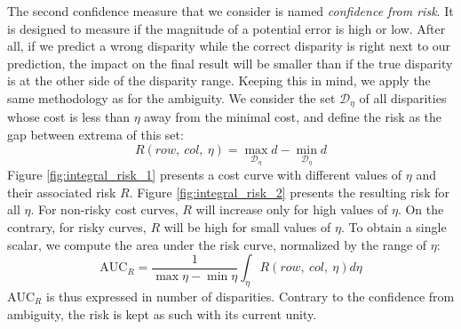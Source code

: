 The second confidence measure that we consider is named \textit{confidence from risk}. It is designed to measure if the magnitude of a potential error is high or low. After all, if we predict a wrong disparity while the correct disparity is right next to our prediction, the impact on the final result will be smaller than if the true disparity is at the other side of the disparity range. Keeping this in mind, we apply the same methodology as for the ambiguity. We consider the set $\mathcal{D}_\eta$ of all disparities whose cost is less than $\eta$ away from the minimal cost, and define the risk as the gap between extrema of this set:
\begin{equation}
    R(row, ~col, ~\eta) = \max_{\mathcal{D}_\eta}d - \min_{\mathcal{D}_\eta}d
\end{equation}
Figure \ref{fig:integral_risk_1} presents a cost curve with different values of $\eta$ and their associated risk $R$. Figure \ref{fig:integral_risk_2} presents the resulting risk for all $\eta$. For non-risky cost curves, $R$ will increase only for high values of $\eta$. On the contrary, for risky curves, $R$ will be high for small values of $\eta$. To obtain a single scalar, we compute the area under the risk curve, normalized by the range of $\eta$:
\begin{equation}
    \mathrm{AUC}_R = \frac{1}{\max\eta-\min\eta}\int_\eta R(row,~col,~\eta)d\eta
\end{equation}
$\mathrm{AUC}_R$ is thus expressed in number of disparities. Contrary to the confidence from ambiguity, the risk is kept as such with its current unity. 

